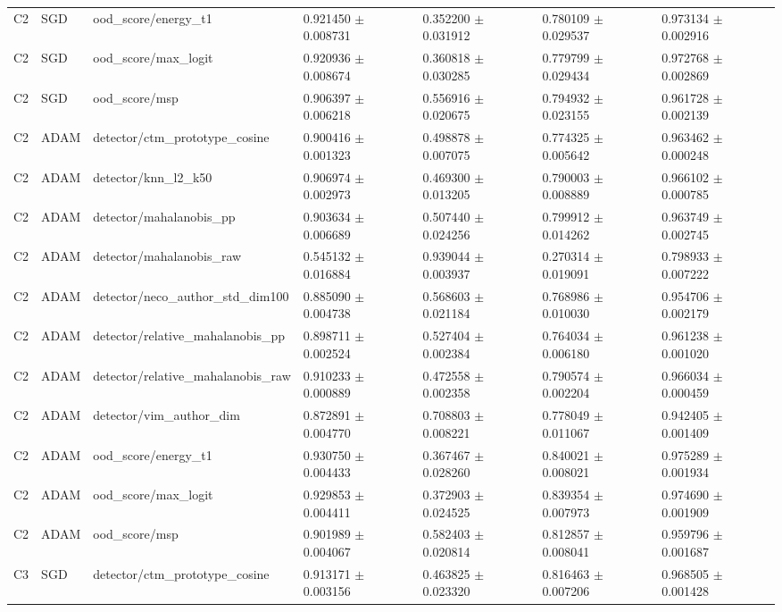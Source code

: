 \begin{longtable}{lllllll}
C2 & SGD & ood\_score/energy\_t1 & 0.921450 $\pm$ 0.008731 & 0.352200 $\pm$ 0.031912 & 0.780109 $\pm$ 0.029537 & 0.973134 $\pm$ 0.002916 \\
C2 & SGD & ood\_score/max\_logit & 0.920936 $\pm$ 0.008674 & 0.360818 $\pm$ 0.030285 & 0.779799 $\pm$ 0.029434 & 0.972768 $\pm$ 0.002869 \\
C2 & SGD & ood\_score/msp & 0.906397 $\pm$ 0.006218 & 0.556916 $\pm$ 0.020675 & 0.794932 $\pm$ 0.023155 & 0.961728 $\pm$ 0.002139 \\
C2 & ADAM & detector/ctm\_prototype\_cosine & 0.900416 $\pm$ 0.001323 & 0.498878 $\pm$ 0.007075 & 0.774325 $\pm$ 0.005642 & 0.963462 $\pm$ 0.000248 \\
C2 & ADAM & detector/knn\_l2\_k50 & 0.906974 $\pm$ 0.002973 & 0.469300 $\pm$ 0.013205 & 0.790003 $\pm$ 0.008889 & 0.966102 $\pm$ 0.000785 \\
C2 & ADAM & detector/mahalanobis\_pp & 0.903634 $\pm$ 0.006689 & 0.507440 $\pm$ 0.024256 & 0.799912 $\pm$ 0.014262 & 0.963749 $\pm$ 0.002745 \\
C2 & ADAM & detector/mahalanobis\_raw & 0.545132 $\pm$ 0.016884 & 0.939044 $\pm$ 0.003937 & 0.270314 $\pm$ 0.019091 & 0.798933 $\pm$ 0.007222 \\
C2 & ADAM & detector/neco\_author\_std\_dim100 & 0.885090 $\pm$ 0.004738 & 0.568603 $\pm$ 0.021184 & 0.768986 $\pm$ 0.010030 & 0.954706 $\pm$ 0.002179 \\
C2 & ADAM & detector/relative\_mahalanobis\_pp & 0.898711 $\pm$ 0.002524 & 0.527404 $\pm$ 0.002384 & 0.764034 $\pm$ 0.006180 & 0.961238 $\pm$ 0.001020 \\
C2 & ADAM & detector/relative\_mahalanobis\_raw & 0.910233 $\pm$ 0.000889 & 0.472558 $\pm$ 0.002358 & 0.790574 $\pm$ 0.002204 & 0.966034 $\pm$ 0.000459 \\
C2 & ADAM & detector/vim\_author\_dim & 0.872891 $\pm$ 0.004770 & 0.708803 $\pm$ 0.008221 & 0.778049 $\pm$ 0.011067 & 0.942405 $\pm$ 0.001409 \\
C2 & ADAM & ood\_score/energy\_t1 & 0.930750 $\pm$ 0.004433 & 0.367467 $\pm$ 0.028260 & 0.840021 $\pm$ 0.008021 & 0.975289 $\pm$ 0.001934 \\
C2 & ADAM & ood\_score/max\_logit & 0.929853 $\pm$ 0.004411 & 0.372903 $\pm$ 0.024525 & 0.839354 $\pm$ 0.007973 & 0.974690 $\pm$ 0.001909 \\
C2 & ADAM & ood\_score/msp & 0.901989 $\pm$ 0.004067 & 0.582403 $\pm$ 0.020814 & 0.812857 $\pm$ 0.008041 & 0.959796 $\pm$ 0.001687 \\
C3 & SGD & detector/ctm\_prototype\_cosine & 0.913171 $\pm$ 0.003156 & 0.463825 $\pm$ 0.023320 & 0.816463 $\pm$ 0.007206 & 0.968505 $\pm$ 0.001428 \\

\end{longtable}

